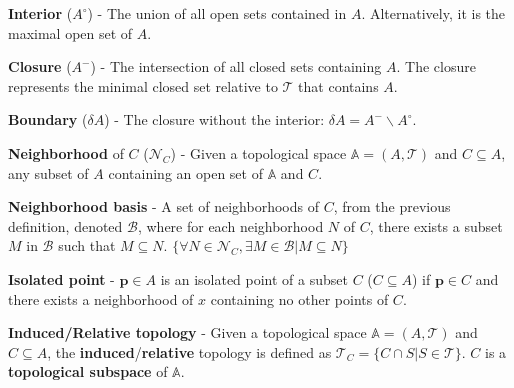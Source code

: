 \begin{defn}
  \textbf{Interior} ($A^{\circ}$) - The union of all open sets
  contained in $A$. Alternatively, it is the maximal open set of $A$.
\end{defn}
\begin{defn}
  \textbf{Closure} ($A^{-}$) - The intersection of all closed sets containing
  $A$. The closure represents the minimal closed set relative to $\mathcal{T}$ that
  contains $A$.
\end{defn}
\begin{defn}
  \textbf{Boundary} ($\delta A$) - The closure without the interior:
  $\delta A = A^{-} \backslash A^{\circ}$.
\end{defn}

\begin{defn}
  \textbf{Neighborhood} of $C$ ($\mathcal{N}_C$) - Given a topological space
  $\mathbb{A}=(A,\mathcal{T})$ and $C \subseteq A$, any subset of $A$ containing
  an open set of $\mathbb{A}$ and $C$.
\end{defn}

\begin{defn}
  \textbf{Neighborhood basis} - A set of neighborhoods of $C$,
  from the previous definition, denoted $\mathcal{B}$, where for each
  neighborhood $N$ of $C$, there exists a subset $M$ in $\mathcal{B}$ such
  that $M \subseteq N$.
  $\{\forall N \in \mathcal{N}_C, \exists M \in \mathcal{B} | M \subseteq N\}$
\end{defn}

\begin{defn}
  \textbf{Isolated point} - $\mathbf{p} \in A$ is an isolated point of a
  subset $C$ ($C \subseteq A$) if $\mathbf{p} \in C$ and there exists a
  neighborhood of $x$ containing no other points of $C$.
\end{defn}

\begin{defn}
  \textbf{Induced/Relative topology} - Given a topological space
  $\mathbb{A}=(A,\mathcal{T})$ and $C \subseteq A$,
  the \textbf{induced}/\textbf{relative} topology is defined as
  $\mathcal{T}_C = \{C \cap S | S \in \mathcal{T}\}$. $C$ is a
  \textbf{topological subspace} of $\mathbb{A}$.
\end{defn}

